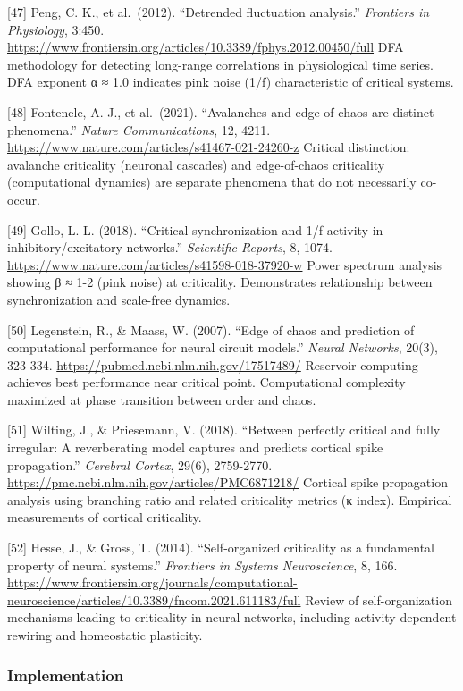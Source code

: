 \documentclass[
  11pt,
]{article}
\begin{document}
{[}47{]} Peng, C. K., et al.~(2012). ``Detrended fluctuation analysis.''
\emph{Frontiers in Physiology}, 3:450.
\url{https://www.frontiersin.org/articles/10.3389/fphys.2012.00450/full}
DFA methodology for detecting long-range correlations in physiological
time series. DFA exponent α ≈ 1.0 indicates pink noise (1/f)
characteristic of critical systems.

{[}48{]} Fontenele, A. J., et al.~(2021). ``Avalanches and edge-of-chaos
are distinct phenomena.'' \emph{Nature Communications}, 12, 4211.
\url{https://www.nature.com/articles/s41467-021-24260-z} Critical
distinction: avalanche criticality (neuronal cascades) and edge-of-chaos
criticality (computational dynamics) are separate phenomena that do not
necessarily co-occur.

{[}49{]} Gollo, L. L. (2018). ``Critical synchronization and 1/f
activity in inhibitory/excitatory networks.'' \emph{Scientific Reports},
8, 1074. \url{https://www.nature.com/articles/s41598-018-37920-w} Power
spectrum analysis showing β ≈ 1-2 (pink noise) at criticality.
Demonstrates relationship between synchronization and scale-free
dynamics.

{[}50{]} Legenstein, R., \& Maass, W. (2007). ``Edge of chaos and
prediction of computational performance for neural circuit models.''
\emph{Neural Networks}, 20(3), 323-334.
\url{https://pubmed.ncbi.nlm.nih.gov/17517489/} Reservoir computing
achieves best performance near critical point. Computational complexity
maximized at phase transition between order and chaos.

{[}51{]} Wilting, J., \& Priesemann, V. (2018). ``Between perfectly
critical and fully irregular: A reverberating model captures and
predicts cortical spike propagation.'' \emph{Cerebral Cortex}, 29(6),
2759-2770. \url{https://pmc.ncbi.nlm.nih.gov/articles/PMC6871218/}
Cortical spike propagation analysis using branching ratio and related
criticality metrics (κ index). Empirical measurements of cortical
criticality.

{[}52{]} Hesse, J., \& Gross, T. (2014). ``Self-organized criticality as
a fundamental property of neural systems.'' \emph{Frontiers in Systems
Neuroscience}, 8, 166.
\url{https://www.frontiersin.org/journals/computational-neuroscience/articles/10.3389/fncom.2021.611183/full}
Review of self-organization mechanisms leading to criticality in neural
networks, including activity-dependent rewiring and homeostatic
plasticity.

\subsubsection{Implementation}\label{implementation}
\end{document}
